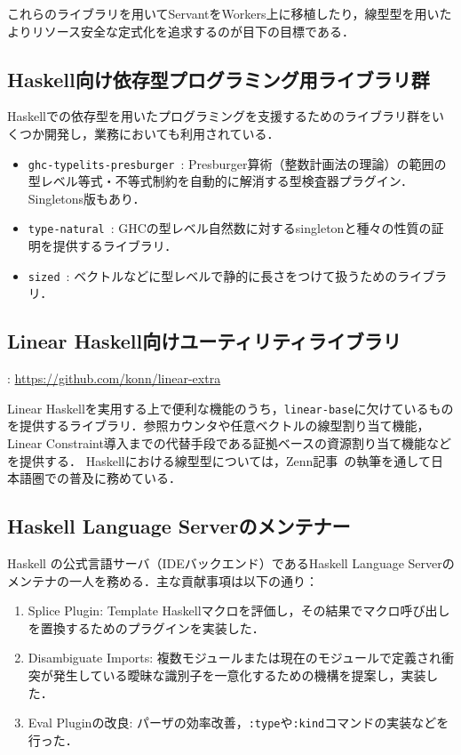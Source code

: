 \documentclass[a4j]{ltjsarticle}
\renewcommand{\emph}[1]{\textbf{\textgt{#1}}}
\begin{document}
\begin{refsection}
これらのライブラリを用いてServantをWorkers上に移植したり，線型型を用いたよりリソース安全な定式化を追求するのが目下の目標である．

\subsection*{Haskell向け依存型プログラミング用ライブラリ群}
Haskellでの依存型を用いたプログラミングを支援するためのライブラリ群をいくつか開発し，業務においても利用されている．

\begin{itemize}
  \item \texttt{ghc-typelits-presburger}~\cite{ghc-typelits-presburger}: Presburger算術（整数計画法の理論）の範囲の型レベル等式・不等式制約を自動的に解消する型検査器プラグイン．Singletons版もあり．
  \item \texttt{type-natural}~\cite{type-natural}: GHCの型レベル自然数に対するsingletonと種々の性質の証明を提供するライブラリ．
  \item \texttt{sized}~\cite{sized}: ベクトルなどに型レベルで静的に長さをつけて扱うためのライブラリ．
\end{itemize}

\subsection*{Linear Haskell向けユーティリティライブラリ}
\vspace{-1em}
\noindent
\emph{URL}: \url{https://github.com/konn/linear-extra}
\vspace{1em}

Linear Haskellを実用する上で便利な機能のうち，\texttt{linear-base}に欠けているものを提供するライブラリ．参照カウンタや任意ベクトルの線型割り当て機能，Linear Constraint導入までの代替手段である証拠ベースの資源割り当て機能などを提供する．
Haskellにおける線型型については，Zenn記事~\cite{ISHII:2023lh1,ISHII:2023lh2}の執筆を通して日本語圏での普及に務めている．

\subsection*{Haskell Language Serverのメンテナー}
Haskell の公式言語サーバ（IDEバックエンド）であるHaskell Language Serverのメンテナの一人を務める．主な貢献事項は以下の通り：
  \begin{enumerate}
    \item Splice Plugin: Template Haskellマクロを評価し，その結果でマクロ呼び出しを置換するためのプラグインを実装した．
    \item Disambiguate Imports: 複数モジュールまたは現在のモジュールで定義され衝突が発生している曖昧な識別子を一意化するための機構を提案し，実装した．
    \item Eval Pluginの改良: パーザの効率改善，\texttt{:type}や\texttt{:kind}コマンドの実装などを行った．
  \end{enumerate}


\end{refsection}
\end{document}
